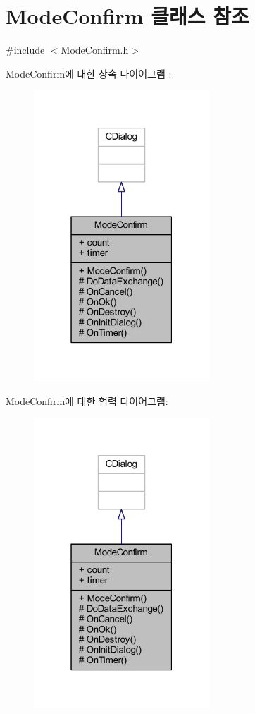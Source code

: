 \hypertarget{class_mode_confirm}{}\section{Mode\+Confirm 클래스 참조}
\label{class_mode_confirm}


{\ttfamily \#include $<$Mode\+Confirm.\+h$>$}



Mode\+Confirm에 대한 상속 다이어그램 \+: \nopagebreak
\begin{figure}[H]
\begin{center}
\leavevmode
\includegraphics[width=187pt]{class_mode_confirm__inherit__graph}
\end{center}
\end{figure}


Mode\+Confirm에 대한 협력 다이어그램\+:\nopagebreak
\begin{figure}[H]
\begin{center}
\leavevmode
\includegraphics[width=187pt]{class_mode_confirm__coll__graph}
\end{center}
\end{figure}
